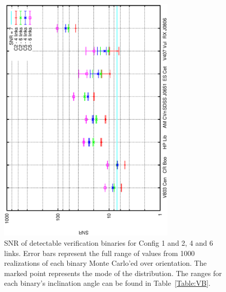 \documentclass{iopart}
\begin{document}
\begin{figure}[H]
\begin{center}
   \includegraphics[angle=270,width=0.75\textwidth]{FigGBTyson/SNR.eps} %
   \caption{SNR of detectable verification binaries for Config 1 and 2, 4 and 6 links.  Error bars represent the full range of values from 1000 realizations of each binary Monte Carlo'ed over orientation.  The marked point represents the mode of the distribution.  The ranges for each binary's inclination angle can be found in Table~\ref{Table:VB}.}
   \label{Figure:VBSNR}
   \end{center}
\end{figure}
\end{document}
